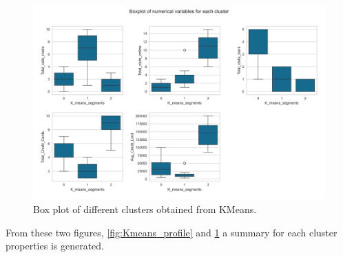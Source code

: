 \documentclass[10pt,a4paper]{style}
\begin{document}
		\begin{figure}[h]
			\centering
			\includegraphics[width=\textwidth]{Kmeans_cluster_box_plots.png}
			\caption{Box plot of different clusters obtained from KMeans.}
			\label{fig:Kmeans_cluster_box_plots}
		\end{figure}
		From these two figures, \ref{fig:Kmeans_profile} and \ref{fig:Kmeans_cluster_box_plots} a summary for each cluster properties is generated.
\end{document}
